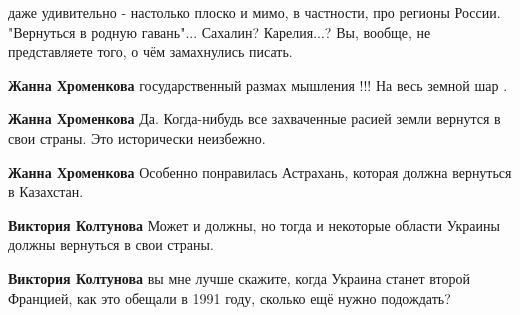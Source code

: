 \begin{itemize}
даже удивительно - настолько плоско и мимо, в частности, про регионы России.
"Вернуться в родную гавань"... Сахалин? Карелия...? Вы, вообще, не
представляете того, о чём замахнулись писать.

\begin{itemize}

 
\textbf{Жанна Хроменкова} государственный размах мышления !!! На весь земной шар .

 
\textbf{Жанна Хроменкова} Да. Когда-нибудь все захваченные расией земли вернутся в свои страны. Это исторически неизбежно.

 
\textbf{Жанна Хроменкова} Особенно понравилась Астрахань, которая должна вернуться в Казахстан.

 
\textbf{Виктория Колтунова} Может и должны, но тогда и некоторые области Украины должны вернуться в свои страны.

 
\textbf{Виктория Колтунова} вы мне лучше скажите, когда Украина станет второй Францией, как это обещали в 1991 году, сколько ещё нужно подождать?

 

\end{itemize}
\end{itemize}
